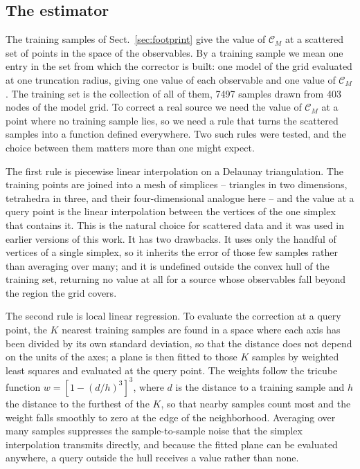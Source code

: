 \documentclass{aa}
\newcommand{\CM}{\mathcal{C}_{M}}
\begin{document}
\subsection{The estimator}
\label{sec:interp}

The training samples of Sect.~\ref{sec:footprint} give the value of $\CM$ at
a scattered set of points in the space of the observables. By a training
sample we mean one entry in the set from which the corrector is built: one
model of the grid evaluated at one truncation radius, giving one value of
each observable and one value of $\CM$. The training set is the collection
of all of them, 7497 samples drawn from 403 nodes of the model grid. To correct a real
source we need the value of $\CM$ at a point where no training sample lies,
so we need a rule that turns the scattered samples into a function defined
everywhere. Two such rules were tested, and the choice between them matters
more than one might expect.

The first rule is piecewise linear interpolation on a Delaunay
triangulation. The training points are joined into a mesh of simplices --
triangles in two dimensions, tetrahedra in three, and their
four-dimensional analogue here -- and the value at a query point is the
linear interpolation between the vertices of the one simplex that contains
it. This is the natural choice for scattered data and it was used in earlier
versions of this work. It has two drawbacks. It uses only the handful of
vertices of a single simplex, so it inherits the error of those few samples
rather than averaging over many; and it is undefined outside the convex hull
of the training set, returning no value at all for a source whose
observables fall beyond the region the grid covers.

The second rule is local linear regression. To evaluate the correction at a
query point, the $K$ nearest training samples are found in a space where
each axis has been divided by its own standard deviation, so that the
distance does not depend on the units of the axes; a plane is then fitted to
those $K$ samples by weighted least squares and evaluated at the query
point. The weights follow the tricube function
$w=\left[1-(d/h)^{3}\right]^{3}$, where $d$ is the distance to a training
sample and $h$ the distance to the furthest of the $K$, so that nearby
samples count most and the weight falls smoothly to zero at the edge of the
neighborhood. Averaging over many samples suppresses the sample-to-sample
noise that the simplex interpolation transmits directly, and because the
fitted plane can be evaluated anywhere, a query outside the hull receives a
value rather than none.
\end{document}
